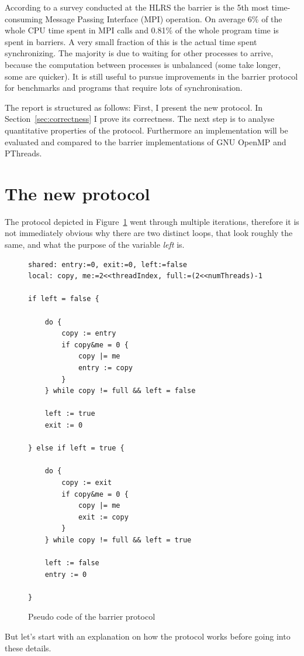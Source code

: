 \documentclass[a4paper, 10pt]{article}
\begin{document}
According to a survey conducted at the HLRS\cite{rab00} the barrier is the 5th most time-consuming Message Passing Interface\cite{mpi} (MPI) operation. On average 6\% of the whole CPU time spent in MPI calls and 0.81\% of the whole program time is spent in barriers. A very small fraction of this is the actual time spent synchronizing. The majority is due to waiting for other processes to arrive, because the computation between processes is unbalanced (some take longer, some are quicker). It is still useful to pursue improvements in the barrier protocol for benchmarks and programs that require lots of synchronisation.

The report is structured as follows: First, I present the new protocol. In Section~\ref{sec:correctness} I prove its correctness. The next step is to analyse quantitative properties of the protocol. Furthermore an implementation will be evaluated and compared to the barrier implementations of GNU OpenMP\cite{gomp} and PThreads\cite{glibc}.

\section{The new protocol}
The protocol depicted in Figure~\ref{fig:barrier-source-code} went through multiple iterations, therefore it is not immediately obvious why there are two distinct loops, that look roughly the same, and what the purpose of the variable \emph{left} is.
\begin{figure}[htbp]
	\centering
	\begin{lstlisting}
shared: entry:=0, exit:=0, left:=false
local: copy, me:=2<<threadIndex, full:=(2<<numThreads)-1

if left = false {

	do {
		copy := entry
		if copy&me = 0 {
			copy |= me
			entry := copy
		}
	} while copy != full && left = false

	left := true
	exit := 0

} else if left = true {

	do {
		copy := exit
		if copy&me = 0 {
			copy |= me
			exit := copy
		}
	} while copy != full && left = true

	left := false
	entry := 0

}
	\end{lstlisting}
	\caption{Pseudo code of the barrier protocol}
	\label{fig:barrier-source-code}
\end{figure}
But let's start with an explanation on how the protocol works before going into these details.
\end{document}

